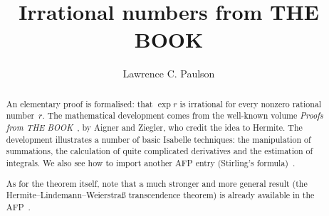 \documentclass[11pt,a4paper]{article}
\begin{document}
\title{Irrational numbers from THE BOOK}
\author{Lawrence C. Paulson}
\maketitle

\begin{abstract}
An elementary proof is formalised: that $\exp r$ is irrational for every nonzero rational number~$r$. The mathematical development comes from the well-known volume \emph{Proofs from THE BOOK}~\cite[pp.--2]{aigner-proofs}, by Aigner and Ziegler, who credit the idea to Hermite. The development illustrates a number of basic Isabelle techniques: the manipulation of summations, the calculation of quite complicated derivatives and the estimation of integrals. 
We also see how to import another AFP entry (Stirling's formula)~\cite{Stirling_Formula-AFP}.

As for the theorem itself, note that a much stronger and more general result (the Hermite--Lindemann--Weierstra\ss{} transcendence theorem) is already available in the AFP~\cite{Hermite_Lindemann-AFP}.
\end{abstract}

\tableofcontents





\end{document}
